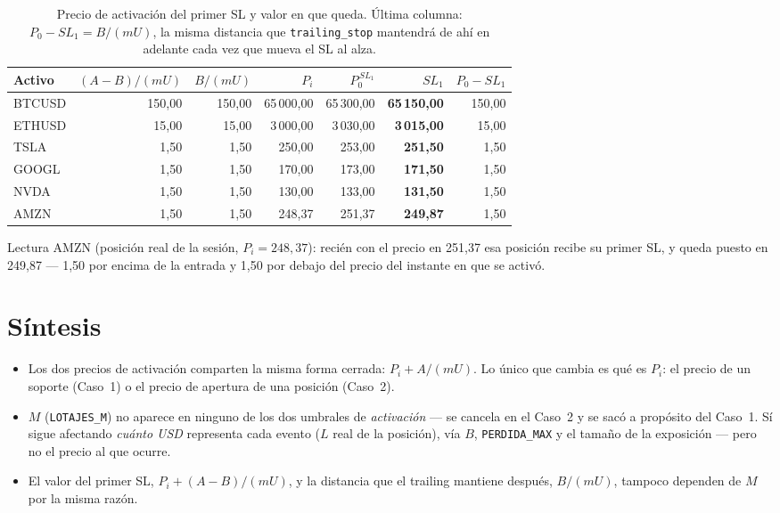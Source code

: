 \documentclass[11pt,a4paper]{article}
\newcommand{\code}[1]{\texttt{\small #1}}
\begin{document}
\begin{table}[h]
\centering
\small
\begin{tabularx}{\linewidth}{@{}l r r r r r r@{}}
\toprule
\textbf{Activo} & $(A-B)/(mU)$ & $B/(mU)$ & $P_i$ & $P_0^{\,SL_1}$ & $SL_1$ & $P_0-SL_1$ \\
\midrule
BTCUSD & 150,00 & 150,00 & 65\,000,00 & 65\,300,00 & \textbf{65\,150,00} & 150,00 \\
ETHUSD & 15,00  & 15,00  & 3\,000,00  & 3\,030,00  & \textbf{3\,015,00}  & 15,00  \\
TSLA   & 1,50   & 1,50   & 250,00     & 253,00     & \textbf{251,50}     & 1,50   \\
GOOGL  & 1,50   & 1,50   & 170,00     & 173,00     & \textbf{171,50}     & 1,50   \\
NVDA   & 1,50   & 1,50   & 130,00     & 133,00     & \textbf{131,50}     & 1,50   \\
AMZN   & 1,50   & 1,50   & 248,37     & 251,37     & \textbf{249,87}     & 1,50   \\
\bottomrule
\end{tabularx}
\caption{Precio de activación del primer SL y valor en que queda. Última columna:
$P_0 - SL_1 = B/(mU)$, la misma distancia que \code{trailing\_stop} mantendrá de ahí
en adelante cada vez que mueva el SL al alza.}
\end{table}

Lectura AMZN (posición real de la sesión, $P_i = 248{,}37$): recién con el precio en
251,37 esa posición recibe su primer SL, y queda puesto en 249,87 — 1,50 por encima de
la entrada y 1,50 por debajo del precio del instante en que se activó.

\section{Síntesis}

\begin{itemize}[leftmargin=1.4em,itemsep=3pt]
\item Los dos precios de activación comparten la misma forma cerrada:
  $P_i + A/(mU)$. Lo único que cambia es qué es $P_i$: el precio de un soporte
  (Caso~1) o el precio de apertura de una posición (Caso~2).
\item $M$ (\code{LOTAJES\_M}) no aparece en ninguno de los dos umbrales de
  \emph{activación} — se cancela en el Caso~2 y se sacó a propósito del Caso~1. Sí
  sigue afectando \emph{cuánto USD} representa cada evento ($L$ real de la posición),
  vía $B$, \code{PERDIDA\_MAX} y el tamaño de la exposición — pero no el precio al que
  ocurre.
\item El valor del primer SL, $P_i + (A-B)/(mU)$, y la distancia que el trailing
  mantiene después, $B/(mU)$, tampoco dependen de $M$ por la misma razón.
\end{itemize}
\end{document}
